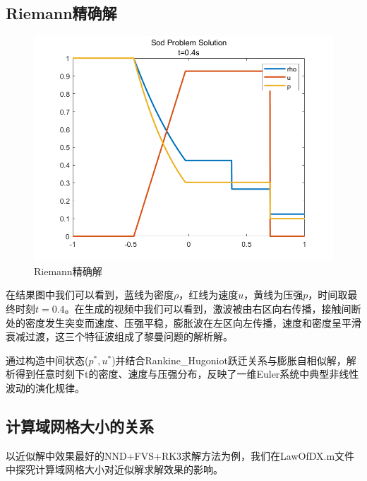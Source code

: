 \documentclass[12pt,a4paper]{article}%
\begin{document}
		\subsection{Riemann精确解}
		\begin{figure}[H]
		\centering
		\begin{minipage}{0.83\textwidth}
			\centering
			\includegraphics[width=\textwidth]{./fig/Riemann.png}
			\caption{\fontsize{10pt}{15pt}\selectfont Riemann精确解}
		\end{minipage}
		\end{figure}
		在结果图中我们可以看到，蓝线为密度$\rho$，红线为速度$u$，黄线为压强$p$，时间取最终时刻$t=0.4$。在生成的视频中我们可以看到，激波被由右区向右传播，接触间断处的密度发生突变而速度、压强平稳，膨胀波在左区向左传播，速度和密度呈平滑衰减过渡，这三个特征波组成了黎曼问题的解析解。
		
		通过构造中间状态($p^*,u^*$)并结合Rankine\_Hugoniot跃迁关系与膨胀自相似解，解析得到任意时刻下t的密度、速度与压强分布，反映了一维Euler系统中典型非线性波动的演化规律。
		
		\subsection{计算域网格大小的关系}
		以近似解中效果最好的NND+FVS+RK3求解方法为例，我们在LawOfDX.m文件中探究计算域网格大小对近似解求解效果的影响。
		
\end{document}
